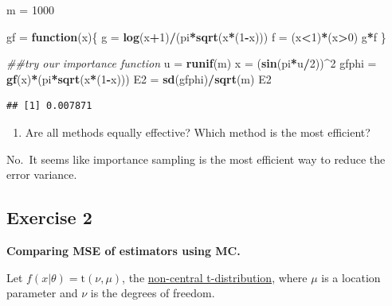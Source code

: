 \documentclass[
]{article}
\newenvironment{Shaded}{\begin{snugshade}}{\end{snugshade}}
\newcommand{\CommentTok}[1]{\textcolor[rgb]{0.56,0.35,0.01}{\textit{#1}}}
\newcommand{\ControlFlowTok}[1]{\textcolor[rgb]{0.13,0.29,0.53}{\textbf{#1}}}
\newcommand{\DecValTok}[1]{\textcolor[rgb]{0.00,0.00,0.81}{#1}}
\newcommand{\KeywordTok}[1]{\textcolor[rgb]{0.13,0.29,0.53}{\textbf{#1}}}
\newcommand{\NormalTok}[1]{#1}
\newcommand{\OperatorTok}[1]{\textcolor[rgb]{0.81,0.36,0.00}{\textbf{#1}}}
\newcommand{\StringTok}[1]{\textcolor[rgb]{0.31,0.60,0.02}{#1}}
\providecommand{\tightlist}{%
  \setlength{\itemsep}{0pt}\setlength{\parskip}{0pt}}
\begin{document}
\begin{Shaded}
\begin{Highlighting}[]
\NormalTok{m =}\StringTok{ }\DecValTok{1000}

\NormalTok{gf =}\StringTok{ }\ControlFlowTok{function}\NormalTok{(x)\{}
\NormalTok{  g =}\StringTok{ }\KeywordTok{log}\NormalTok{(x}\OperatorTok{+}\DecValTok{1}\NormalTok{)}\OperatorTok{/}\NormalTok{(pi}\OperatorTok{*}\KeywordTok{sqrt}\NormalTok{(x}\OperatorTok{*}\NormalTok{(}\DecValTok{1}\OperatorTok{-}\NormalTok{x)))}
\NormalTok{  f =}\StringTok{ }\NormalTok{(x}\OperatorTok{<}\DecValTok{1}\NormalTok{)}\OperatorTok{*}\NormalTok{(x}\OperatorTok{>}\DecValTok{0}\NormalTok{)}
\NormalTok{  g}\OperatorTok{*}\NormalTok{f}
\NormalTok{\}}

\CommentTok{##try our importance function}
\NormalTok{u =}\StringTok{ }\KeywordTok{runif}\NormalTok{(m)}
\NormalTok{x =}\StringTok{ }\NormalTok{(}\KeywordTok{sin}\NormalTok{(pi}\OperatorTok{*}\NormalTok{u}\OperatorTok{/}\DecValTok{2}\NormalTok{))}\OperatorTok{^}\DecValTok{2}
\NormalTok{gfphi =}\StringTok{ }\KeywordTok{gf}\NormalTok{(x)}\OperatorTok{*}\NormalTok{(pi}\OperatorTok{*}\KeywordTok{sqrt}\NormalTok{(x}\OperatorTok{*}\NormalTok{(}\DecValTok{1}\OperatorTok{-}\NormalTok{x)))}
\NormalTok{E2 =}\StringTok{ }\KeywordTok{sd}\NormalTok{(gfphi)}\OperatorTok{/}\KeywordTok{sqrt}\NormalTok{(m)}
\NormalTok{E2}
\end{Highlighting}
\end{Shaded}

\begin{verbatim}
## [1] 0.007871
\end{verbatim}

\begin{enumerate}
\def\labelenumi{\alph{enumi}.}
\setcounter{enumi}{5}
\tightlist
\item
  Are all methods equally effective? Which method is the most efficient?
\end{enumerate}

No.~It seems like importance sampling is the most efficient way to
reduce the error variance.

\hypertarget{exercise-2}{%
\subsection{Exercise 2}\label{exercise-2}}

\textbf{Comparing MSE of estimators using MC.}

Let \(f(x|\theta) = \mathrm{t}(\nu,\mu)\), the
\href{https://en.wikipedia.org/wiki/Noncentral_t-distribution}{non-central
t-distribution}, where \(\mu\) is a location parameter and \(\nu\) is
the degrees of freedom.
\end{document}
